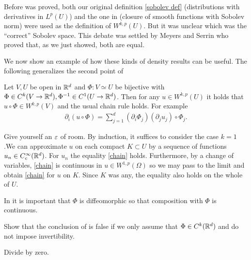 \documentclass[
    a4paper,
    DIV=14,
    abstract=true,
    numbers=noenddot
]{scrartcl}
\begin{document}
Before   was proved, both our original definition  \ref{sobolev def} (distributions with derivatives in $L^p(U)$) and the one in  (closure of smooth functions with Sobolev norm) were used as the definition of $W^{k,p}(U)$. But it was unclear which was the ``correct'' Sobolev space. This debate was settled by Meyers and Serrin who proved that, as we just showed, both are equal.

We now show an example of how these kinds of density results can be useful. The following generalizes the second point of 
\begin{exercise}\label{change of variables}
	Let $V,U$ be open in  $\mathbb{R}^d$ and $\Phi: V \simeq U$ be bijective with $ \Phi \in C^k(V \to \mathbb{R}^d), \Phi^{-1} \in C^1(U\to \mathbb{R}^d)$. Then for any $u \in  W^{k,p}(U)$ it holds that $u \circ\Phi \in W^{k,p}(V)$ and the usual chain rule holds. For example
	\begin{align}\label{chain}
		\partial _i (u\circ \Phi) = \sum_{j=1}^d (\partial _i \Phi_j)(\partial _j u_j)\circ \Phi_j  .
	\end{align}
\end{exercise}
\begin{hint}
	Give yourself an $\varepsilon $ of room.
	By induction, it suffices to consider the case $k=1$.We can approximate $u$ on each compact  $K \subset U$ by a sequence of functions $u_n \in C_c^\infty(\mathbb{R}^d)$. For $u_n$ the equality \ref{chain} holds. Furthermore, by a change of variables, \eqref{chain} is continuous in $u\in W^{1,p}(\Omega)$ so we may pass to the limit and obtain \eqref{chain} for $u$ on $K$. Since $K$ was any, the equality also holds on the whole of $U$.
\end{hint}
In  it is important that $\Phi$ is diffeomorphic so that composition with $\Phi$ is continuous.
\begin{exercise}
	Show that the conclusion of  is false if we only assume that $\Phi \in C^k(\mathbb{R}^d)$ and do not impose invertibility.
\end{exercise}
\begin{hint}
	Divide by zero.
\end{hint}
\end{document}
